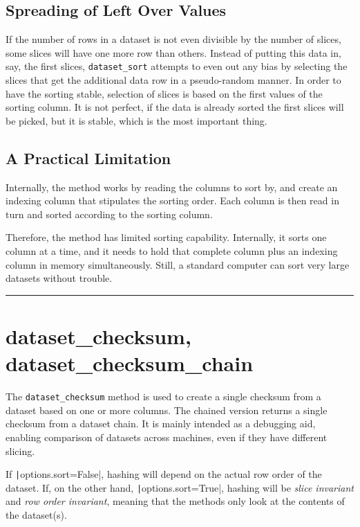 \subsection*{Spreading of Left Over Values}
If the number of rows in a dataset is not even divisible by the number
of slices, some slices will have one more row than others.  Instead of
putting this data in, say, the first slices, \texttt{dataset\_sort}
attempts to even out any bias by selecting the slices that get the
additional data row in a pseudo-random manner.  In order to have the
sorting stable, selection of slices is based on the first values of
the sorting column.  It is not perfect, if the data is already sorted
the first slices will be picked, but it is stable, which is the most
important thing.





\subsection{A Practical Limitation}
Internally, the method works by reading the columns to sort by, and
create an indexing column that stipulates the sorting order.  Each
column is then read in turn and sorted according to the sorting
column.

Therefore, the method has limited sorting capability.  Internally, it
sorts one column at a time, and it needs to hold that complete column
plus an indexing column in memory simultaneously.  Still, a standard
computer can sort very large datasets without trouble.






\par\noindent\rule{\textwidth}{0.4pt}

\section{dataset\_checksum, dataset\_checksum\_chain}

The \texttt{dataset\_checksum} method is used to create a single
checksum from a dataset based on one or more columns.  The chained
version returns a single checksum from a dataset chain.  It is mainly
intended as a debugging aid, enabling comparison of datasets across
machines, even if they have different slicing.

If \texttt|options.sort=False|, hashing will depend on the
actual row order of the dataset.  If, on the other
hand, \texttt|options.sort=True|, hashing will
be \textsl{slice invariant} and \textsl{row order invariant}, meaning
that the methods only look at the contents of the dataset(s).

